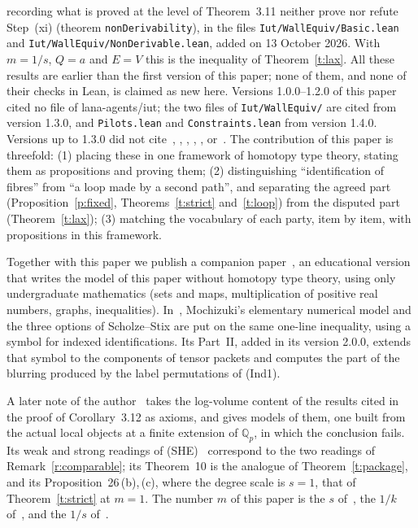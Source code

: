\documentclass[11pt,a4paper]{article}
\theoremstyle{plain}
\theoremstyle{definition}
\theoremstyle{remark}
\begin{document}
recording what is proved at the level of Theorem~3.11 neither prove nor refute Step~(xi) (theorem
\texttt{nonDerivability}), in the files \texttt{Iut/WallEquiv/Basic.lean} and \texttt{Iut/WallEquiv/NonDerivable.lean},
added on 13 October 2026. With $m=1/s$, $Q=a$ and $E=V$ this is the inequality of Theorem~\ref{t:lax}. All these
results are earlier than the first version of this paper; none of them, and none of their checks in Lean, is claimed
as new here. Versions 1.0.0--1.2.0 of this paper cited no file of lana-agents/iut; the two files of
\texttt{Iut/WallEquiv/} are cited from version 1.3.0, and \texttt{Pilots.lean} and \texttt{Constraints.lean} from
version 1.4.0. Versions up to 1.3.0 did not cite~\cite{Wh}, \cite{Mi}, \cite{Go}, \cite{TK}, \cite{Sf}, \cite{Form}
or~\cite{Ri}. The
contribution of this paper is threefold: (1) placing these in one framework
of homotopy type theory, stating them as propositions and proving them; (2) distinguishing ``identification of
fibres'' from ``a loop made by a second path'', and separating the agreed part (Proposition~\ref{p:fixed},
Theorems~\ref{t:strict} and~\ref{t:loop}) from the disputed part (Theorem~\ref{t:lax}); (3) matching the vocabulary of
each party, item by item, with propositions in this framework.

Together with this paper we publish a companion paper~\cite{UE}, an educational version that writes the model of this
paper without homotopy type theory, using only undergraduate mathematics (sets and maps, multiplication of positive real
numbers, graphs, inequalities). In~\cite{UE}, Mochizuki's elementary numerical model and the three options of
Scholze--Stix are put on the same one-line inequality, using a symbol for indexed identifications. Its Part~II, added
in its version 2.0.0, extends that symbol to the components of tensor packets and computes the part of the blurring
produced by the label permutations of (Ind1).

A later note of the author~\cite{W311} takes the log-volume content of the results cited in the proof of
Corollary~3.12 as axioms, and gives models of them, one built from the actual local objects at a finite extension of
$\mathbb{Q}_p$, in which the conclusion fails. Its weak and strong readings of (SHE)~\cite[Definition~4,
Corollary~11]{W311} correspond to the two readings of Remark~\ref{r:comparable}; its Theorem~10 is the analogue of
Theorem~\ref{t:package}, and its Proposition~26\,(b),\,(c), where the degree scale is $s=1$, that of
Theorem~\ref{t:strict} at $m=1$. The number $m$ of this paper is the $s$ of~\cite{W311}, the $1/k$
of~\cite{UE,RF,TC,BS}, and the $1/s$ of~\cite{LANAiut}.
\end{document}
